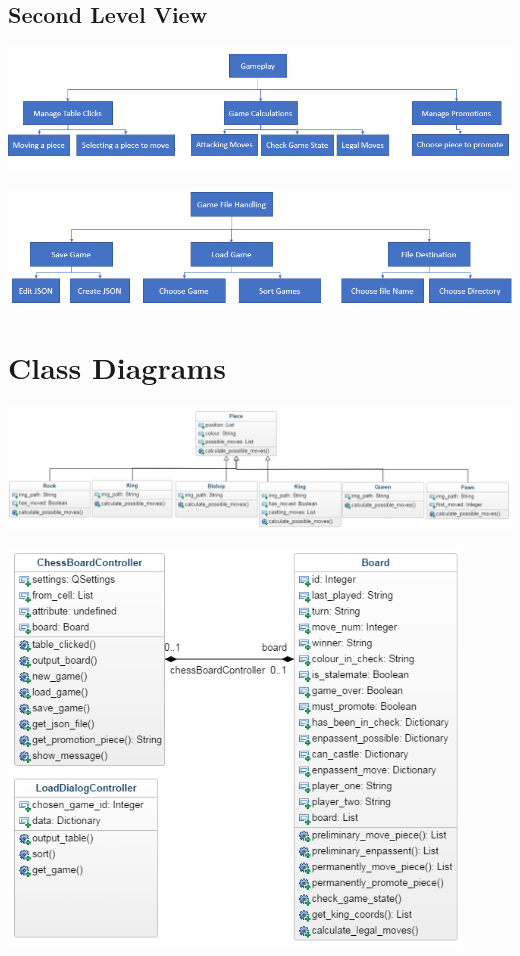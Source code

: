 \documentclass[]{report}
\begin{document}
\subsection{Second Level View}
\begin{center}
	\includegraphics[width=1.0\textwidth]{images/design-charts/gameplay_level}
\end{center}
\begin{center}
	\includegraphics[width=1.0\textwidth]{images/design-charts/filehandling_level}
\end{center}
\section{Class Diagrams}
\begin{center}
	\includegraphics[width=1.0\textwidth]{images/class-diagrams/pieces}
\end{center}
\begin{center}
	\includegraphics[width=0.9\textwidth]{images/class-diagrams/board}
\end{center}
\end{document}
